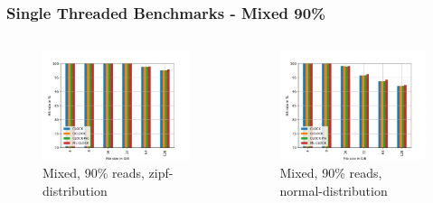 \documentclass[
	aspectratio=169,
	compress,
]{beamer}
\newcommand{\navframetitle}[1]{\frametitle{#1\hfill{\footnotesize\lastsection{}}}}
\begin{document}

\begin{frame}[fragile]
	\navframetitle{Single Threaded Benchmarks - Mixed 90\%}

	\begin{columns}
		\begin{column}{0.5\textwidth}
			\begin{figure}
        		\includegraphics[width=\textwidth]{rw_90to10_zipf.jpg}
        		\caption{Mixed, 90\% reads, zipf-distribution}
			\end{figure}
		\end{column}
		\begin{column}{0.5\textwidth}
			\begin{figure}[ht]
    			\centering
    			\includegraphics[width=\textwidth]{rw_90to10_normal.jpg}
        		\caption{Mixed, 90\% reads, normal-distribution}
			\end{figure}			
		\end{column}
	\end{columns}
\end{frame}
\end{document}
